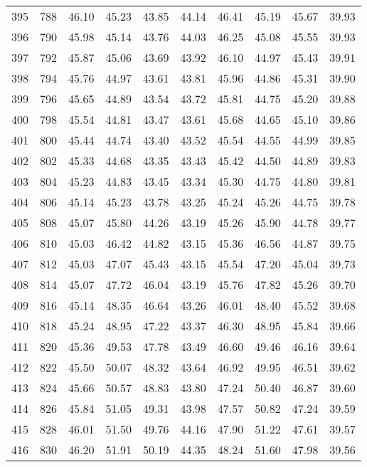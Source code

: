 \begin{longtable}{rrllllllll}
		395 & 788 & 46.10 & 45.23 & 43.85 & 44.14 & 46.41 & 45.19 & 45.67 & 39.93 \\ 
		396 & 790 & 45.98 & 45.14 & 43.76 & 44.03 & 46.25 & 45.08 & 45.55 & 39.93 \\ 
		397 & 792 & 45.87 & 45.06 & 43.69 & 43.92 & 46.10 & 44.97 & 45.43 & 39.91 \\ 
		398 & 794 & 45.76 & 44.97 & 43.61 & 43.81 & 45.96 & 44.86 & 45.31 & 39.90 \\ 
		399 & 796 & 45.65 & 44.89 & 43.54 & 43.72 & 45.81 & 44.75 & 45.20 & 39.88 \\ 
		400 & 798 & 45.54 & 44.81 & 43.47 & 43.61 & 45.68 & 44.65 & 45.10 & 39.86 \\ 
		401 & 800 & 45.44 & 44.74 & 43.40 & 43.52 & 45.54 & 44.55 & 44.99 & 39.85 \\ 
		402 & 802 & 45.33 & 44.68 & 43.35 & 43.43 & 45.42 & 44.50 & 44.89 & 39.83 \\ 
		403 & 804 & 45.23 & 44.83 & 43.45 & 43.34 & 45.30 & 44.75 & 44.80 & 39.81 \\ 
		404 & 806 & 45.14 & 45.23 & 43.78 & 43.25 & 45.24 & 45.26 & 44.75 & 39.78 \\ 
		405 & 808 & 45.07 & 45.80 & 44.26 & 43.19 & 45.26 & 45.90 & 44.78 & 39.77 \\ 
		406 & 810 & 45.03 & 46.42 & 44.82 & 43.15 & 45.36 & 46.56 & 44.87 & 39.75 \\ 
		407 & 812 & 45.03 & 47.07 & 45.43 & 43.15 & 45.54 & 47.20 & 45.04 & 39.73 \\ 
		408 & 814 & 45.07 & 47.72 & 46.04 & 43.19 & 45.76 & 47.82 & 45.26 & 39.70 \\ 
		409 & 816 & 45.14 & 48.35 & 46.64 & 43.26 & 46.01 & 48.40 & 45.52 & 39.68 \\ 
		410 & 818 & 45.24 & 48.95 & 47.22 & 43.37 & 46.30 & 48.95 & 45.84 & 39.66 \\ 
		411 & 820 & 45.36 & 49.53 & 47.78 & 43.49 & 46.60 & 49.46 & 46.16 & 39.64 \\ 
		412 & 822 & 45.50 & 50.07 & 48.32 & 43.64 & 46.92 & 49.95 & 46.51 & 39.62 \\ 
		413 & 824 & 45.66 & 50.57 & 48.83 & 43.80 & 47.24 & 50.40 & 46.87 & 39.60 \\ 
		414 & 826 & 45.84 & 51.05 & 49.31 & 43.98 & 47.57 & 50.82 & 47.24 & 39.59 \\ 
		415 & 828 & 46.01 & 51.50 & 49.76 & 44.16 & 47.90 & 51.22 & 47.61 & 39.57 \\ 
		416 & 830 & 46.20 & 51.91 & 50.19 & 44.35 & 48.24 & 51.60 & 47.98 & 39.56 \\ 

\end{longtable}
